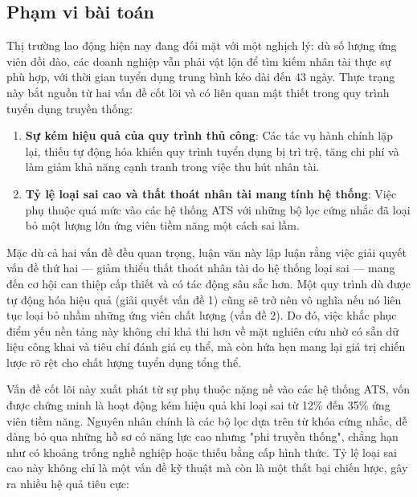 \documentclass{article}
\begin{document}
\subsection{Phạm vi bài toán}
Thị trường lao động hiện nay đang đối mặt với một nghịch lý: dù số lượng ứng viên dồi dào, các doanh nghiệp vẫn phải vật lộn để tìm kiếm nhân tài thực sự phù hợp, với thời gian tuyển dụng trung bình kéo dài đến 43 ngày. Thực trạng này bắt nguồn từ hai vấn đề cốt lõi và có liên quan mật thiết trong quy trình tuyển dụng truyền thống:

\begin{enumerate}[topsep=0pt, itemsep=0pt, leftmargin=40pt, label=\arabic*.]
    \item \textbf{Sự kém hiệu quả của quy trình thủ công}: Các tác vụ hành chính lặp lại, thiếu tự động hóa khiến quy trình tuyển dụng bị trì trệ, tăng chi phí và làm giảm khả năng cạnh tranh trong việc thu hút nhân tài.
    \item \textbf{Tỷ lệ loại sai cao và thất thoát nhân tài mang tính hệ thống}: Việc phụ thuộc quá mức vào các hệ thống ATS với những bộ lọc cứng nhắc đã loại bỏ một lượng lớn ứng viên tiềm năng một cách sai lầm.
\end{enumerate}

Mặc dù cả hai vấn đề đều quan trọng, luận văn này lập luận rằng việc giải quyết vấn đề thứ hai — giảm thiểu thất thoát nhân tài do hệ thống loại sai — mang đến cơ hội can thiệp cấp thiết và có tác động sâu sắc hơn. Một quy trình dù được tự động hóa hiệu quả (giải quyết vấn đề 1) cũng sẽ trở nên vô nghĩa nếu nó liên tục loại bỏ nhầm những ứng viên chất lượng (vấn đề 2). Do đó, việc khắc phục điểm yếu nền tảng này không chỉ khả thi hơn về mặt nghiên cứu nhờ có sẵn dữ liệu công khai và tiêu chí đánh giá cụ thể, mà còn hứa hẹn mang lại giá trị chiến lược rõ rệt cho chất lượng tuyển dụng tổng thể.

Vấn đề cốt lõi này xuất phát từ sự phụ thuộc nặng nề vào các hệ thống ATS, vốn được chứng minh là hoạt động kém hiệu quả khi loại sai từ 12\% đến 35\% ứng viên tiềm năng. Nguyên nhân chính là các bộ lọc dựa trên từ khóa cứng nhắc, dễ dàng bỏ qua những hồ sơ có năng lực cao nhưng "phi truyền thống", chẳng hạn như có khoảng trống nghề nghiệp hoặc thiếu bằng cấp hình thức. Tỷ lệ loại sai cao này không chỉ là một vấn đề kỹ thuật mà còn là một thất bại chiến lược, gây ra nhiều hệ quả tiêu cực:
\end{document}
